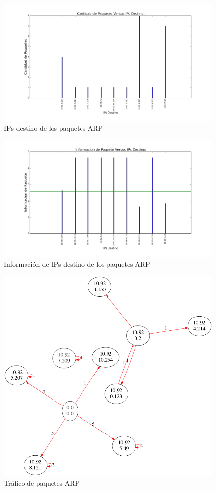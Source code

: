 \begin{figure}[H]
       \centering
       \includegraphics[width=1\textwidth]{../resultados/subte/histogram_dst.png}
       \caption{IPs destino de los paquetes ARP}
       \label{red-hogarena-arp-destination}
\end{figure}

\begin{figure}[H]
       \centering
       \includegraphics[width=1\textwidth]{../resultados/subte/histogram_dst_information.png}
       \caption{Información de IPs destino de los paquetes ARP}
       \label{red-hogarena-arp-destination-info}
\end{figure}

\begin{figure}[H]
       \centering
       \includegraphics[width=1\textwidth]{../resultados/subte/network.png}
       \caption{Tráfico de paquetes ARP}
       \label{red-hogarena-arp-traffic}
\end{figure}